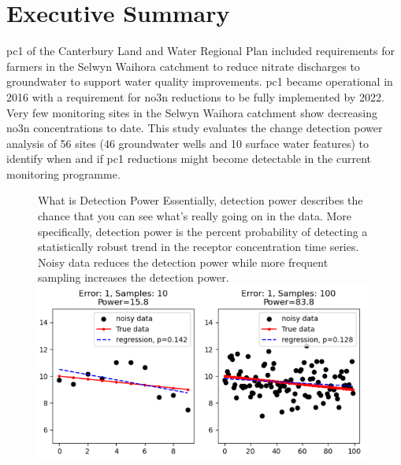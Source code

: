 
\section*{Executive Summary} \label{exsum} %

\gls{pc1} of the Canterbury Land and Water Regional Plan included requirements for farmers in the Selwyn Waihora catchment to reduce nitrate discharges to groundwater to support water quality improvements.
\gls{pc1} became operational in 2016 with a requirement for \gls{no3n} reductions to be fully implemented by 2022.
Very few monitoring sites in the Selwyn Waihora catchment show decreasing \gls{no3n} concentrations to date.
This study evaluates the change detection power analysis of 56 sites (46 groundwater wells and 10 surface water features) to identify when and if \gls{pc1} reductions might become detectable in the current monitoring programme.

\begin{figure}
    \begin{breakawaybox}[]{What is Detection Power}
        Essentially, detection power describes the chance that you can see what's really going on in the data.
        More specifically, detection power is the percent probability of detecting a statistically robust trend in the receptor concentration time series.
        Noisy data reduces the detection power while more frequent sampling increases the detection power.
        \\
        \includegraphics[width=0.99\textwidth]{figures/dp_ex_small}
    \end{breakawaybox}
\end{figure}

